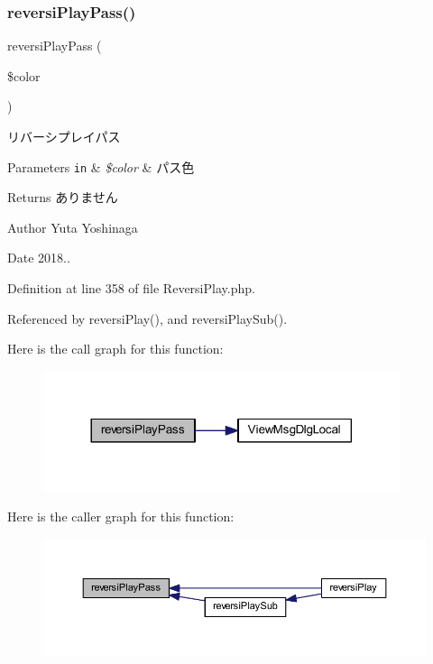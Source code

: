 \subsubsection{\texorpdfstring{reversi\+Play\+Pass()}{reversiPlayPass()}}
{\footnotesize\ttfamily reversi\+Play\+Pass (\begin{DoxyParamCaption}\item[{}]{\$color }\end{DoxyParamCaption})}



リバーシプレイパス 


\begin{DoxyParams}[1]{Parameters}
\mbox{\tt in}  & {\em \$color} & パス色 \\
\hline
\end{DoxyParams}
\begin{DoxyReturn}{Returns}
ありません 
\end{DoxyReturn}
\begin{DoxyAuthor}{Author}
Yuta Yoshinaga 
\end{DoxyAuthor}
\begin{DoxyDate}{Date}
2018.. 
\end{DoxyDate}


Definition at line 358 of file Reversi\+Play.\+php.



Referenced by reversi\+Play(), and reversi\+Play\+Sub().

Here is the call graph for this function\+:
\nopagebreak
\begin{figure}[H]
\begin{center}
\leavevmode
\includegraphics[width=296pt]{class_reversi_play_a67816fe65a87e35d8e8cc35d5d269bcb_cgraph}
\end{center}
\end{figure}
Here is the caller graph for this function\+:
\nopagebreak
\begin{figure}[H]
\begin{center}
\leavevmode
\includegraphics[width=350pt]{class_reversi_play_a67816fe65a87e35d8e8cc35d5d269bcb_icgraph}
\end{center}
\end{figure}
\mbox{\label{class_reversi_play_a990fc6e45b7bdf2dab569f087f8b5a62}} 
